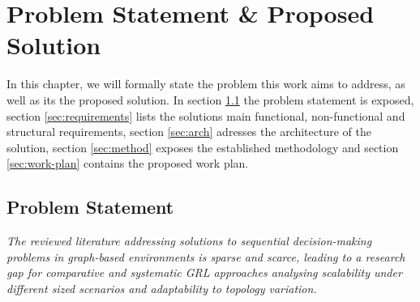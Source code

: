 \chapter{Problem Statement \& Proposed Solution} \label{chap:proposed-solution}

In this chapter, we will formally state the problem this work aims to address, as well as its the proposed solution. In section \ref{sec:problem} the problem statement is exposed, section \ref{sec:requirements} lists the solutions main functional, non-functional and structural requirements, section \ref{sec:arch} adresses the architecture of the solution, section \ref{sec:method} exposes the established methodology and section \ref{sec:work-plan} contains the proposed work plan.

\section{Problem Statement} \label{sec:problem}

\begin{displayquote}
	 \textit{The reviewed literature addressing solutions to sequential decision-making problems in graph-based environments is sparse and scarce, leading to a research gap for comparative and systematic \ac{GRL} approaches analysing scalability under different sized scenarios and adaptability to topology variation.}
\end{displayquote}

